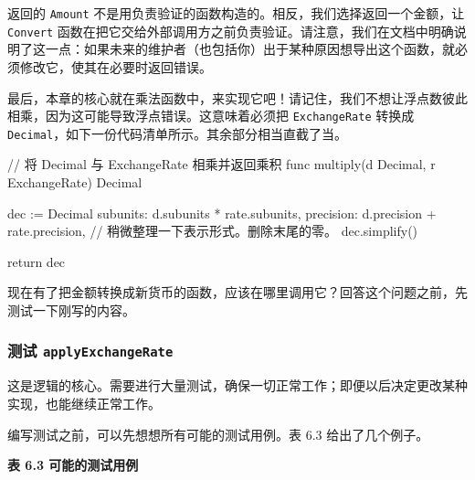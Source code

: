 返回的 \texttt{Amount} 不是用负责验证的函数构造的。相反，我们选择返回一个金额，让 \texttt{Convert} 函数在把它交给外部调用方之前负责验证。请注意，我们在文档中明确说明了这一点：如果未来的维护者（也包括你）出于某种原因想导出这个函数，就必须修改它，使其在必要时返回错误。

最后，本章的核心就在乘法函数中，来实现它吧！请记住，我们不想让浮点数彼此相乘，因为这可能导致浮点错误。这意味着必须把 \texttt{ExchangeRate} 转换成 \texttt{Decimal}，如下一份代码清单所示。其余部分相当直截了当。

\begin{gocode}[title={代码清单 6.21 \texttt{convert.go}：\texttt{multiply}}]
// 将 Decimal 与 ExchangeRate 相乘并返回乘积
func multiply(d Decimal, r ExchangeRate) Decimal {
    dec := Decimal{
        subunits: d.subunits * rate.subunits,
        precision: d.precision + rate.precision,
    }
    // 稍微整理一下表示形式。删除末尾的零。
    dec.simplify()

    return dec
}
\end{gocode}

现在有了把金额转换成新货币的函数，应该在哪里调用它？回答这个问题之前，先测试一下刚写的内容。

\Needspace{0.78\textheight}
\subsubsection*{测试 \texttt{applyExchangeRate}}

这是逻辑的核心。需要进行大量测试，确保一切正常工作；即便以后决定更改某种实现，也能继续正常工作。

编写测试之前，可以先想想所有可能的测试用例。表 6.3 给出了几个例子。

\medskip
\noindent\textbf{表 6.3 可能的测试用例}

